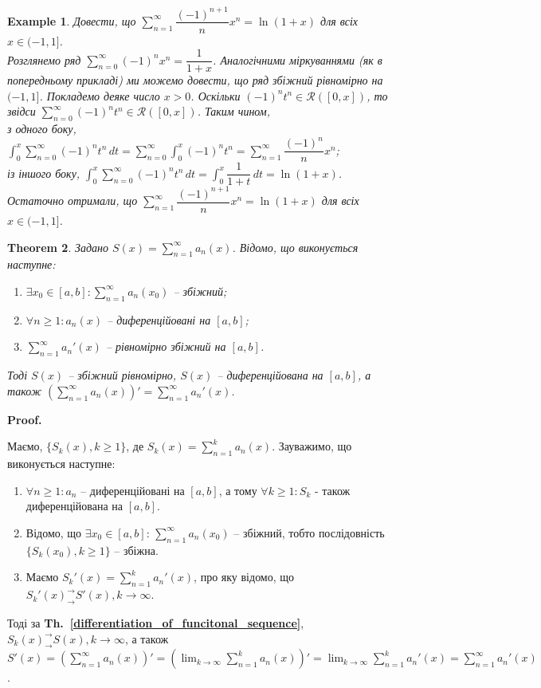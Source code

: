 \documentclass[a4paper, 10pt]{article}
\makeatletter
\def\huge{\displaystyle}
\theoremstyle{theoremdd}
\newtheorem{theorem}{Theorem}[subsection]
\theoremstyle{theoremdd}
\theoremstyle{theoremdd}
\theoremstyle{theoremdd}
\theoremstyle{theoremdd}
\newtheorem{example}[theorem]{Example}
\theoremstyle{theoremdd}
\theoremstyle{theoremdd}
\theoremstyle{theoremdd}
\theoremstyle{theoremdd}
\newcommand\thref[1]{\textbf{Th.~\ref{#1}}}
\renewenvironment{proof}[1][Proof.\\]{\par
\pushQED{\hfill \qed}%
\normalfont \topsep6\p@\@plus6\p@\relax
\trivlist
\item\relax
{\bfseries
#1\@addpunct{.}}\hspace\labelsep\ignorespaces
}{%
\popQED\endtrivlist\@endpefalse
}
\makeatother
\begin{document}
\begin{example}
Довести, що $\huge\sum_{n=1}^\infty \dfrac{(-1)^{n+1}}{n}x^n = \ln (1+x)$ для всіх $x \in (-1,1]$.\\
Розглянемо ряд $\huge\sum_{n=0}^\infty (-1)^n x^n = \dfrac{1}{1+x}$. Аналогічними міркуваннями (як в попередньому прикладі) ми можемо довести, що ряд збіжний рівномірно на $(-1,1]$. Покладемо деяке число $x > 0$. Оскільки $(-1)^n t^n \in \mathcal{R}([0,x])$, то звідси $\huge\sum_{n=0}^\infty (-1)^n t^n \in \mathcal{R}([0,x])$. Таким чином,\\
з одного боку, $\huge\int_0^x \huge\sum_{n=0}^\infty (-1)^n t^n \,dt = \sum_{n=0}^\infty \int_0^x (-1)^n t^n = \sum_{n=1}^\infty \dfrac{(-1)^n}{n}x^n$;\\
із іншого боку, $\huge\int_0^x \huge\sum_{n=0}^\infty (-1)^n t^n \,dt = \int_0^x \dfrac{1}{1+t}\,dt = \ln (1+x)$.\\
Остаточно отримали, що $\huge\sum_{n=1}^\infty \dfrac{(-1)^{n+1}}{n}x^n = \ln (1+x)$ для всіх $x \in (-1,1]$.
\end{example}

\begin{theorem}
Задано $S(x) = \huge \sum_{n=1}^\infty a_n(x)$. Відомо, що виконується наступне:
\begin{enumerate}[nosep,wide=0pt,label={\arabic*)}]
\item $\exists x_0 \in [a,b]: \huge \sum_{n=1}^\infty a_n(x_0)$ -- збіжний;
\item $\forall n \geq 1: a_n(x)$ -- диференційовані на $[a,b]$;
\item $\huge \sum_{n=1}^\infty a_n'(x)$ -- рівномірно збіжний на $[a,b]$.
\end{enumerate}
Тоді $S(x)$ -- збіжний рівномірно, $S(x)$ -- диференційована на $[a,b]$, а також $\huge \left(  \sum_{n=1}^\infty a_n(x) \right)' = \sum_{n=1}^\infty a_n'(x)$.
\end{theorem}

\begin{proof}
Маємо, $\{S_k(x), k \geq 1\}$, де $S_k(x) = \huge\sum_{n=1}^k a_n(x)$. Зауважимо, що виконується наступне:
\begin{enumerate}[nosep,wide=0pt,label={\arabic*)}]
\item $\forall n \geq 1: a_n$ -- диференційовані на $[a,b]$, а тому $\forall k \geq 1: S_k$ - також диференційована на $[a,b]$.
\item Відомо, що $\exists x_0 \in [a,b]$: $\huge\sum_{n=1}^\infty a_n(x_0)$ -- збіжний, тобто послідовність $\{S_k(x_0), k \geq 1\}$ -- збіжна.
\item Маємо $S_k'(x) = \huge\sum_{n=1}^k a_n'(x)$, про яку відомо, що $S_k'(x)^\rightarrow_\rightarrow S'(x), k \to \infty$.
\end{enumerate}
Тоді за \thref{differentiation_of_funcitonal_sequence}, $S_k(x)^\rightarrow_\rightarrow S(x), k \to \infty$, а також\\
$S'(x) = \huge\left(\sum_{n=1}^\infty a_n(x) \right)' = \left( \lim_{k \to \infty} \sum_{n=1}^k a_n(x) \right)' = \lim_{k \to \infty} \sum_{n=1}^k a_n'(x) = \sum_{n=1}^\infty a_n'(x)$.
\end{proof}
\end{document}
